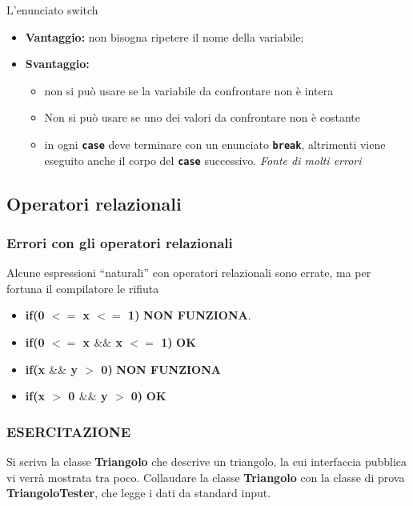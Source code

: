\begin{frame}
\begin{block}{L'enunciato switch}
\begin{itemize}
\item \textbf{Vantaggio:} non bisogna ripetere il nome della variabile;
\item \textbf{Svantaggio:}
\begin{itemize}
\item non si può usare se la variabile da confrontare non è intera
\item Non si può usare se uno dei valori da confrontare non è costante
\item in ogni \textbf{\texttt{case}} deve terminare con un enunciato \textbf{\texttt{break}}, altrimenti viene eseguito anche il corpo
del \textbf{\texttt{case}} successivo. \textit{Fonte di molti errori}
\end{itemize}
\end{itemize}
\end{block}
\end{frame}

\subsection*{Operatori relazionali}
\begin{frame}
\frametitle{Errori con gli operatori relazionali}
\begin{block}{}
Alcune espressioni ``naturali'' con operatori relazionali sono errate, ma per fortuna il compilatore le rifiuta
\begin{itemize}
\item \textbf{if(0 \alert{$<=$} x \alert{$<=$} 1)} \textbf{\alert{NON FUNZIONA}}.
\item \textbf{if(0 $<=$ x $\&\&$ x $<=$ 1)} \textbf{OK}
\item \textbf{if(x \alert{$\&\&$} y $>$ 0)} \textbf{\alert{NON FUNZIONA}}
\item \textbf{if(x $>$ 0 \alert{$\&\&$} y $>$ 0)} \textbf{OK}
\end{itemize}
\end{block}
\end{frame}

\begin{frame}
\frametitle{ESERCITAZIONE}
\begin{block}{}
Si scriva la classe \textbf{Triangolo} che descrive un triangolo, la cui interfaccia pubblica vi verrà mostrata tra poco. Collaudare
la classe \textbf{Triangolo} con la classe di prova \textbf{TriangoloTester}, che legge i dati da standard input.
\end{block}
\end{frame}

